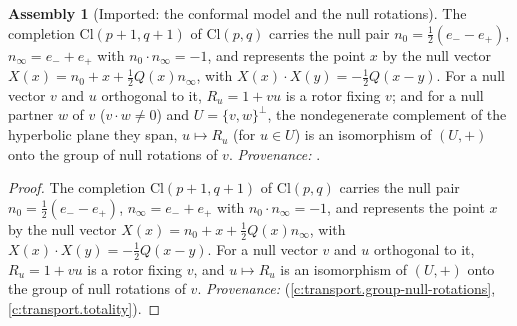\documentclass[11pt]{article}
\theoremstyle{definition}
\newtheorem{assembled}[theorem]{Assembly}
\theoremstyle{plain}
\providecommand{\Cl}{}\renewcommand{\Cl}{\mathrm{Cl}}
\providecommand{\nInf}{}\renewcommand{\nInf}{n_\infty}
\providecommand{\nO}{}\renewcommand{\nO}{n_0}
\begin{document}
\begin{assembled}[Imported: the conformal model and the null rotations]\label{c:angle.imported-conformal-model-null-rotations}
The completion $\Cl(p{+}1,q{+}1)$ of $\Cl(p,q)$ carries the null pair $\nO = \tfrac12(e_{-} - e_{+})$, $\nInf = e_{-} + e_{+}$ with $\nO \cdot \nInf = -1$, and represents the point $x$ by the null vector $X(x) = \nO + x + \tfrac12 Q(x)\nInf$, with $X(x)\cdot X(y) = -\tfrac12 Q(x - y)$. For a null vector $v$ and $u$ orthogonal to it, $R_{u} = 1 + vu$ is a rotor fixing $v$; and for a null partner $w$ of $v$ ($v \cdot w \neq 0$) and $U = \{v, w\}^{\perp}$, the nondegenerate complement of the hyperbolic plane they span, $u \mapsto R_{u}$ (for $u \in U$) is an isomorphism of $(U, +)$ onto the group of null rotations of $v$. \emph{Provenance:} \cite[Sec.~4.3, Lem.~4.6, Thm.~4.10]{ButlerT1}.
\end{assembled}
\begin{proof}
The completion $\Cl(p{+}1,q{+}1)$ of $\Cl(p,q)$ carries the null pair $\nO = \tfrac12(e_{-} - e_{+})$, $\nInf = e_{-} + e_{+}$ with $\nO \cdot \nInf = -1$, and represents the point $x$ by the null vector $X(x) = \nO + x + \tfrac12 Q(x)\nInf$, with $X(x)\cdot X(y) = -\tfrac12 Q(x - y)$. For a null vector $v$ and $u$ orthogonal to it, $R_{u} = 1 + vu$ is a rotor fixing $v$, and $u \mapsto R_{u}$ is an isomorphism of $(U, +)$ onto the group of null rotations of $v$. \emph{Provenance:} \cite[Sec.~4.3, Lem.~4.6, Thm.~4.10]{ButlerT1} (\ref{c:transport.group-null-rotations}, \ref{c:transport.totality}).

\end{proof}
\end{document}
